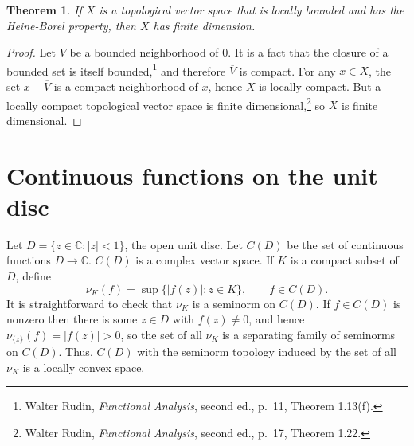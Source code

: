 \documentclass{article}
\newtheorem{theorem}{Theorem}
\begin{document}
\begin{theorem}
If $X$ is a topological vector space that is locally bounded and has the Heine-Borel property, then $X$ has finite dimension.
\label{finitedim}
\end{theorem}
\begin{proof}
Let $V$ be a bounded neighborhood of $0$. It is a fact that the closure of a bounded set is itself bounded,\footnote{Walter Rudin,
{\em Functional Analysis}, second ed., p.~11, Theorem 1.13(f).} and therefore $\overline{V}$ is compact. 
For any $x \in X$, the set $x+\overline{V}$ is a compact neighborhood of $x$, hence $X$ is locally compact. 
But a locally compact topological vector space is finite dimensional,\footnote{Walter Rudin, {\em Functional Analysis}, second ed.,
p.~17, Theorem 1.22.} so $X$ is finite dimensional.
\end{proof}




\section{Continuous functions on the unit disc}
Let $D=\{z \in \mathbb{C}:|z|<1\}$, the open unit disc.
Let $C(D)$ be the set of continuous functions $D \to \mathbb{C}$.  $C(D)$ is a complex vector space.
If $K$ is a compact subset of $D$, define
\[
\nu_K(f)=\sup \{ | f(z)|: z \in K\}, \qquad f \in C(D).
\]
It is straightforward to check that $\nu_K$ is a seminorm on $C(D)$.
If $f \in C(D)$ is nonzero then there is some $z \in D$ with $f(z) \neq 0$, and hence
$\nu_{\{z\}}(f) =|f(z)| >0$, so the set of all $\nu_K$ is a separating family of seminorms on $C(D)$. Thus, $C(D)$ with the seminorm topology induced by
the set of all $\nu_K$ is a locally convex space.
\end{document}
